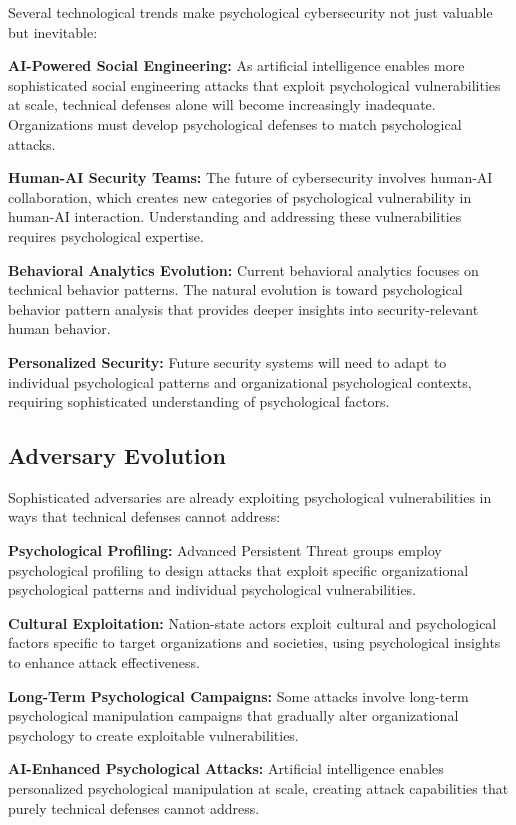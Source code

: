 \documentclass[10pt, twocolumn]{article}
\begin{document}
Several technological trends make psychological cybersecurity not just valuable but inevitable:

\textbf{AI-Powered Social Engineering:} As artificial intelligence enables more sophisticated social engineering attacks that exploit psychological vulnerabilities at scale, technical defenses alone will become increasingly inadequate. Organizations must develop psychological defenses to match psychological attacks.

\textbf{Human-AI Security Teams:} The future of cybersecurity involves human-AI collaboration, which creates new categories of psychological vulnerability in human-AI interaction. Understanding and addressing these vulnerabilities requires psychological expertise.

\textbf{Behavioral Analytics Evolution:} Current behavioral analytics focuses on technical behavior patterns. The natural evolution is toward psychological behavior pattern analysis that provides deeper insights into security-relevant human behavior.

\textbf{Personalized Security:} Future security systems will need to adapt to individual psychological patterns and organizational psychological contexts, requiring sophisticated understanding of psychological factors.

\subsection{Adversary Evolution}

Sophisticated adversaries are already exploiting psychological vulnerabilities in ways that technical defenses cannot address:

\textbf{Psychological Profiling:} Advanced Persistent Threat groups employ psychological profiling to design attacks that exploit specific organizational psychological patterns and individual psychological vulnerabilities.

\textbf{Cultural Exploitation:} Nation-state actors exploit cultural and psychological factors specific to target organizations and societies, using psychological insights to enhance attack effectiveness.

\textbf{Long-Term Psychological Campaigns:} Some attacks involve long-term psychological manipulation campaigns that gradually alter organizational psychology to create exploitable vulnerabilities.

\textbf{AI-Enhanced Psychological Attacks:} Artificial intelligence enables personalized psychological manipulation at scale, creating attack capabilities that purely technical defenses cannot address.
\end{document}
